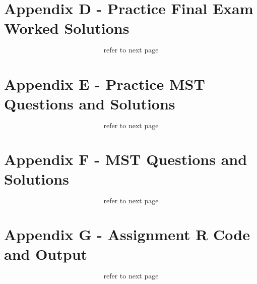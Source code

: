 \documentclass[11pt]{article}
\begin{document}
\newpage

\section{Appendix D - Practice Final Exam Worked Solutions}
$$\text{refer to next page}$$


\section{Appendix E - Practice MST Questions and Solutions}
$$\text{refer to next page}$$


\section{Appendix F - MST Questions and Solutions}
$$\text{refer to next page}$$


\section{Appendix G - Assignment R Code and Output}
$$\text{refer to next page}$$

\end{document}
